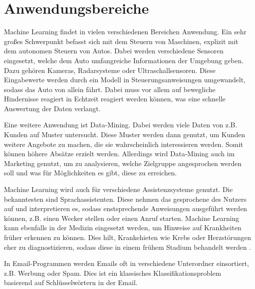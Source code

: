 \section{Anwendungsbereiche}
\label{sec:anwendungsbereiche}
Machine Learning findet in vielen verschiedenen Bereichen Anwendung. Ein sehr großes Schwerpunkt befasst sich mit dem Steuern von Maschinen, explizit mit dem autonomen Steuern von Autos. Dabei werden verschiedene Sensoren eingesetzt, welche dem Auto umfangreiche Informationen der Umgebung geben. Dazu gehören Kameras, Radarsysteme oder Ultraschallsensoren. Diese Eingabewerte werden durch ein Modell in Steuerungsanweisungen umgewandelt, sodass das Auto von allein fährt. Dabei muss vor allem auf bewegliche Hindernisse reagiert in Echtzeit reagiert werden können, was eine schnelle Auswertung der Daten verlangt.

Eine weitere Anwendung ist Data-Mining. Dabei werden viele Daten von z.B. Kunden auf Muster untersucht. Diese Muster werden dann genutzt, um Kunden weitere Angebote zu machen, die sie wahrscheinlich interessieren werden. Somit können höhere Absätze erzielt werden. Allerdings wird Data-Mining auch im Marketing genutzt, um zu analysieren, welche Zielgruppe angesprochen werden soll und was für Möglichkeiten es gibt, diese zu erreichen.

Machine Learning wird auch für verschiedene Assistenzsysteme genutzt. Die bekanntesten sind Sprachassistenten. Diese nehmen das gesprochene des Nutzers auf und interpretieren es, sodass enstsprechende Anweisungen ausgeführt werden können, z.B. einen Wecker stellen oder einen Anruf starten.
Machine Learning kann ebenfalls in der Medizin eingesetzt werden, um Hinweise auf Krankheiten früher erkennen zu können. Dies hilt, Krankehieten wie Krebs oder Herzstörungen eher zu diagnostizieren, sodass diese in einem frühem Stadium behandelt werden \cite[vgl][]{AnwendungsBsp}.

In Email-Programmen werden Emails oft in verschiedene Unterordner einsortiert, z.B. Werbung oder Spam. Dies ist ein klassisches Klassifikationsproblem basierend auf Schlüsselwörtern in der Email.